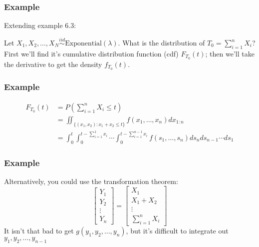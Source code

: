 \documentclass{beamer}
\begin{document}
\begin{frame}
\frametitle{Example}

Extending example 6.3:
\newline

Let $X_1, X_2, \ldots, X_N \overset{iid}{\sim} \text{Exponential}(\lambda)$. What is the distribution of $T_0 = \sum_{i=1}^n X_i$? First we'll find it's cumulative distribution function (cdf) $F_{T_0}(t)$; then we'll take the derivative to get the density $f_{T_0}(t)$. 


\end{frame}



\begin{frame}
\frametitle{Example}

\begin{align*}
F_{T_0}(t) &= P\left(\sum_{i=1}^n X_i \le t \right) \\
&= \iint_{ \{(x_1, x_2) : x_1 + x_2 \le t\} } f(x_1, \ldots, x_n) dx_{1:n} \\
&= \int_0^t \int_0^{t - \sum_{i=1}^{1} x_i} \cdots \int_{0}^{t - \sum_{i=1}^{n-1} x_i} f(s_1, \ldots, s_n) ds_n ds_{n-1} \cdots ds_{1} 
\end{align*}


\end{frame}



\begin{frame}
\frametitle{Example}

Alternatively, you could use the transformation theorem:
\[
\left[\begin{array}{ccc}
Y_1 \\
Y_2 \\
\vdots \\
Y_n
\end{array}\right] 
=
\left[\begin{array}{ccc}
X_1 \\
X_1 + X_2 \\
\vdots \\
\sum_{i=1}^n X_i
\end{array}\right]
\]
It isn't that bad to get $g(y_1, y_2, \ldots, y_n)$, but it's difficult to integrate out $y_1, y_2, \ldots, y_{n-1}$
\end{frame}


\end{document}
